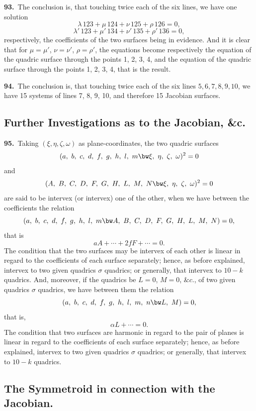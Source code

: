 \documentclass[11pt,a4paper]{article}
\begin{document}
\medskip

\textbf{93.}\ The conclusion is, that touching twice each of the six lines, we have one solution
\[
\lambda\,123 + \mu\,124 + \nu\,125 + \rho\,126 = 0,
\]
\[
\lambda'\,123 + \mu'\,134 + \nu'\,135 + \rho'\,136 = 0,
\]
respectively, the coefficients of the two surfaces being in evidence. And it is clear that for $\mu = \mu'$, $\nu = \nu'$, $\rho = \rho'$, the equations become respectively the equation of the quadric surface through the points 1, 2, 3, 4, and the equation of the quadric surface through the points 1, 2, 3, 4, that is the result.

\medskip

\textbf{94.}\ The conclusion is, that touching twice each of the six lines $5, 6, 7, 8, 9, 10$, we have 15 systems of lines 7, 8, 9, 10, and therefore 15 Jacobian surfaces.

\newpage
\setcounter{page}{171}

\subsection*{Further Investigations as to the Jacobian, \&c.}

\noindent\textbf{95.}\ Taking $(\xi, \eta, \zeta, \omega)$ as plane-coordinates, the two quadric surfaces
\[
(a,\ b,\ c,\ d,\ f,\ g,\ h,\ l,\ m \bw\xi,\ \eta,\ \zeta,\ \omega)^2 = 0
\]
and
\[
(A,\ B,\ C,\ D,\ F,\ G,\ H,\ L,\ M,\ N \bw\xi,\ \eta,\ \zeta,\ \omega)^2 = 0
\]
are said to be intervex (or intervex) one of the other, when we have between the coefficients the relation
\[
(a,\ b,\ c,\ d,\ f,\ g,\ h,\ l,\ m \bw A,\ B,\ C,\ D,\ F,\ G,\ H,\ L,\ M,\ N) = 0,
\]
that is
\[
aA + \cdots + 2fF + \cdots = 0.
\]
The condition that the two surfaces may be intervex of each other is linear in regard to the coefficients of each surface separately; hence, as before explained, intervex to two given quadrics $\sigma$ quadrics; or generally, that intervex to $10 - k$ quadrics. And, moreover, if the quadrics be $L = 0$, $M = 0$, $\&c.$, of two given quadrics $\sigma$ quadrics, we have between them the relation
\[
(a,\ b,\ c,\ d,\ f,\ g,\ h,\ l,\ m,\ n \bw L,\ M) = 0,
\]
that is,
\[
\alpha L + \cdots = 0.
\]
The condition that two surfaces are harmonic in regard to the pair of planes is linear in regard to the coefficients of each surface separately; hence, as before explained, intervex to two given quadrics $\sigma$ quadrics; or generally, that intervex to $10 - k$ quadrics.

\subsection*{The Symmetroid in connection with the Jacobian.}
\end{document}
